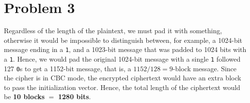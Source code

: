 \documentclass[12pt]{article}
\numberwithin{equation}{section}
\theoremstyle{plain}
\begin{document}
\section*{Problem 3}

Regardless of the length of the plaintext,
we must pad it with something, otherwise it would be impossible to distinguish
between, for example, a 1024-bit message ending in a \texttt{1}, and a 1023-bit message that was padded to 1024 bits with a \texttt{1}.
Hence, we would pad the original 1024-bit message with a single \texttt{1} followed 127 \texttt{0}s to get a 1152-bit message,
that is, a $1152 / 128 = 9$-block message.
Since the cipher is in CBC mode, the encrypted ciphertext would have an extra block to pass the initialization vector.
Hence, the total length of the ciphertext would be \textbf{10 blocks} $=$ \textbf{1280 bits}.
\end{document}
